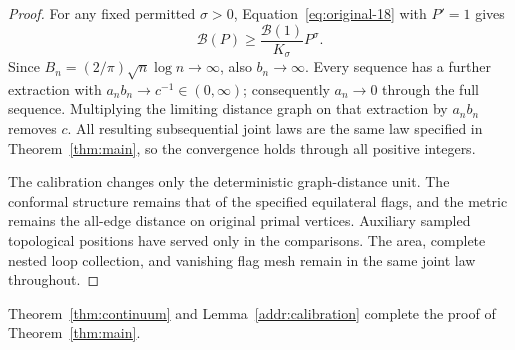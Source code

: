 \begin{proof}
For any fixed permitted $\sigma>0$, Equation~\eqref{eq:original-18}
with $P'=1$ gives
\[
       \mathcal B(P)\ge
              \frac{\mathcal B(1)}{K_\sigma}P^\sigma.
\]
Since $B_n=(2/\pi)\sqrt n\log n\to\infty$, also $b_n\to\infty$.
Every sequence has a further extraction with
$a_nb_n\to c^{-1}\in(0,\infty)$; consequently $a_n\to0$
through the full sequence.  Multiplying the limiting
distance graph on that extraction by $a_nb_n$ removes $c$.
All resulting subsequential joint laws are the same law
specified in Theorem~\ref{thm:main}, so the convergence
holds through all positive integers.

The calibration changes only the deterministic graph-distance
unit.  The conformal structure remains that of the specified
equilateral flags, and the metric remains the all-edge
distance on original primal vertices.  Auxiliary sampled
topological positions have served only in the comparisons.
The area, complete nested loop collection, and vanishing
flag mesh remain in the same joint law throughout.
\end{proof}

Theorem~\ref{thm:continuum} and Lemma~\ref{addr:calibration}
complete the proof of Theorem~\ref{thm:main}.
